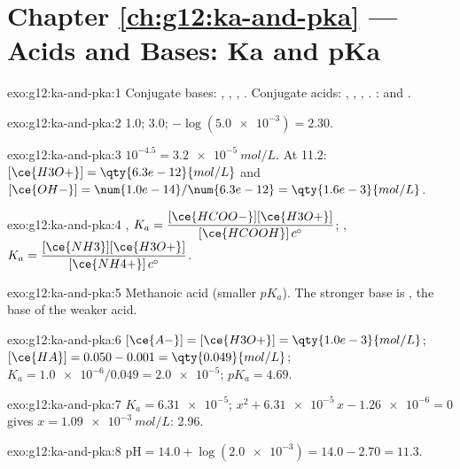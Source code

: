 \section*{Chapter \ref{ch:g12:ka-and-pka} --- Acids and Bases: Ka and pKa}

\begin{solution}{exo:g12:ka-and-pka:1}
Conjugate bases: , , , . Conjugate
acids: , , , . : 
and .
\end{solution}

\begin{solution}{exo:g12:ka-and-pka:2}
 1.0; 3.0; $-\log(\num{5.0e-3}) = 2.30$.
\end{solution}

\begin{solution}{exo:g12:ka-and-pka:3}
$10^{-4.5} = \qty{3.2e-5}{mol/L}$. At  11.2:
$[\ce{H3O+}] = \qty{6.3e-12}{mol/L}$ and
$[\ce{OH-}] = \num{1.0e-14}/\num{6.3e-12} = \qty{1.6e-3}{mol/L}$.
\end{solution}

\begin{solution}{exo:g12:ka-and-pka:4}
,
$K_a = \dfrac{[\ce{HCOO-}][\ce{H3O+}]}{[\ce{HCOOH}]\,c^\circ}$;
,
$K_a = \dfrac{[\ce{NH3}][\ce{H3O+}]}{[\ce{NH4+}]\,c^\circ}$.
\end{solution}

\begin{solution}{exo:g12:ka-and-pka:5}
Methanoic acid (smaller $pK_a$). The stronger base is , the
base of the weaker acid.
\end{solution}

\begin{solution}{exo:g12:ka-and-pka:6}
$[\ce{A-}] = [\ce{H3O+}] = \qty{1.0e-3}{mol/L}$;
$[\ce{HA}] = 0.050 - 0.001 = \qty{0.049}{mol/L}$;
$K_a = \num{1.0e-6}/0.049 = \num{2.0e-5}$; $pK_a = 4.69$.
\end{solution}

\begin{solution}{exo:g12:ka-and-pka:7}
$K_a = \num{6.31e-5}$; $x^2 + \num{6.31e-5}\,x - \num{1.26e-6} = 0$ gives
$x = \qty{1.09e-3}{mol/L}$:  2.96.
\end{solution}

\begin{solution}{exo:g12:ka-and-pka:8}
$\mathrm{pH} = 14.0 + \log(\num{2.0e-3}) = 14.0 - 2.70 = 11.3$.
\end{solution}

